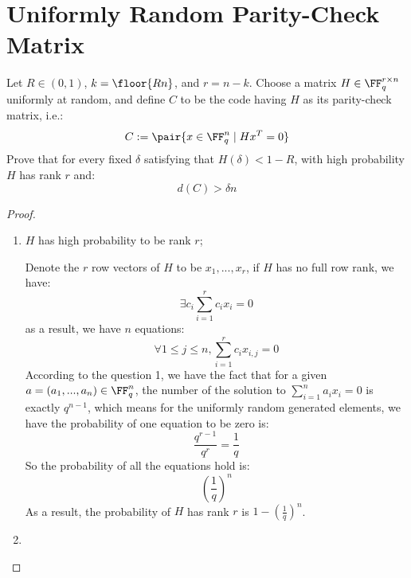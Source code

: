 \section{Uniformly Random Parity-Check Matrix}
Let \( R \in ( 0, 1 ) \), \( k = \floor{ R n } \), and \( r = n - k \). Choose a matrix \( H \in \FF_q^{ r \times n } \) uniformly at random, and define \( C \) to be the code having \( H \) as its parity-check matrix, i.e.:
\[
    C := \pair{
        x \in \FF_q^n 
        \mid 
        H x^T = 0
    }
\]
Prove that for every fixed \( \delta \) satisfying that \( H( \delta ) < 1 - R \), with high probability \( H \) has rank \( r \) and:
\[
    d( C ) > \delta n
\]
\begin{proof}
\begin{enumerate} 
\item \( H \) has high probability to be rank \( r \);

Denote the \( r \) row vectors of \( H \) to be \( x_1, ..., x_r \), if \( H \) has no full row rank, we have:
    \[
        \exists c_i \sum_{ i = 1 }^{ r } 
        c_i x_i = 0
    \]
    as a result, we have \( n \) equations:
    \[
        \forall 1 \le j \le n, \sum_{ i = 1 }^{ r }
        c_i x_{i, j} = 0
    \]
    According to the question 1, we have the fact that for a given \( a = ( a_1, ..., a_n ) \in \FF_q^n \), the number of the solution to \( \sum_{ i = 1 }^n a_i x_i = 0 \) is exactly \( q^{ n - 1 } \), which means for the uniformly random generated elements, we have the probability of one equation to be zero is:
    \[
        \frac{ q^{ r - 1 } }{ q^r } = \frac{ 1 }{ q }
    \]
    So the probability of all the equations hold is:
    \[
        \left( \frac{1}{q} \right)^n
    \]
    As a result, the probability of \( H \) has rank \( r \) is \( 1 - \left( \frac{1}{q} \right)^n \).

\item 


\end{enumerate}
\end{proof}


